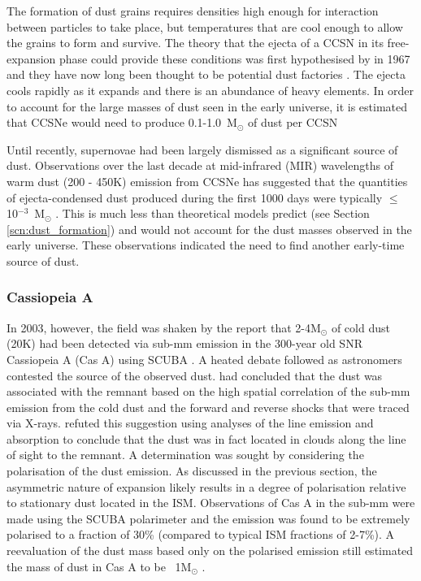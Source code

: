 The formation of dust grains requires densities high enough for interaction between particles to take place, but temperatures that are cool enough to allow the grains to form and survive.  The theory that the ejecta of a CCSN in its free-expansion phase could provide these conditions  was first hypothesised by \citeauthor{Cernuschi1967} in 1967 and they have now long been thought to be potential dust factories \citep{Hoyle1970, Kozasa1991, Todini2001,Nozawa2003}.  The ejecta cools rapidly as it expands and there is an abundance of heavy elements.  In order to account for the large masses of dust seen in the early universe, it is estimated that CCSNe would need to produce  0.1-1.0~M$_\odot$ of dust per CCSN  \citep{Morgan2003, Dwek2007}

Until recently, supernovae had been largely dismissed as a significant source of dust.  Observations over the last decade at mid-infrared (MIR) wavelengths of warm dust (200 - 450K) emission from CCSNe has suggested that the quantities of ejecta-condensed dust produced during the first 1000 days were typically $\leq$ 10$^{-3}$~M$_\odot$  \citep{Sugerman2006, Meikle2007, Kotak2009, Andrews2010, Fabbri2011}.  This is much less than theoretical models predict (see Section \ref{scn:dust_formation}) and would not account for the dust masses observed in the early universe.  These observations indicated the need to find another early-time source of dust.

\subsubsection{Cassiopeia A}

In 2003, however, the field was shaken by the report that 2-4M$_{\odot}$ of cold dust (20K) had been detected via sub-mm emission in the 300-year old SNR Cassiopeia A (Cas A) using SCUBA \citep{Dunne2003}.   A heated debate followed as astronomers contested the source of the observed dust.  \citet{Dunne2003} had concluded that the dust was associated with the remnant based on the high spatial correlation of the sub-mm emission from the cold dust and the forward and reverse shocks that were traced via X-rays. \citet{Krause2004} refuted this suggestion using analyses of the line emission and absorption to conclude that the dust was in fact located in clouds along the line of sight to the remnant.  A determination was sought by considering the polarisation of the dust emission.  As discussed in the previous section, the asymmetric nature of expansion likely results in a degree of polarisation relative to stationary dust located in the ISM.  Observations of Cas A in the sub-mm were made using the SCUBA polarimeter and the emission was found to be extremely polarised to a fraction of 30\% (compared to typical ISM fractions of 2-7\%).  A reevaluation of the dust mass based only on the polarised emission still estimated the mass of dust in Cas A to be ~1M$_{\odot}$ \citep{Dunne2009}.

